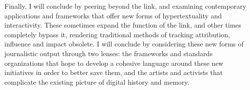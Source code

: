 Finally, I will conclude by peering beyond the link, and examining contemporary applications and frameworks that offer new forms of hypertextuality and interactivity. These sometimes expand the function of the link, and other times completely bypass it, rendering traditional methods of tracking attribution, influence and impact obsolete. I will conclude by considering these new forms of journalistic output through two lenses: the frameworks and standards organizations that hope to develop a cohesive language around these new initiatives in order to better save them, and the artists and activists that complicate the existing picture of digital history and memory.




